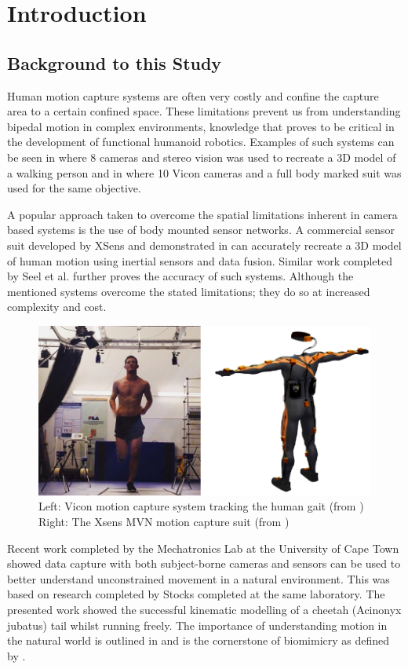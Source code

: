 \chapter{Introduction}

\section{Background to this Study}
Human motion capture systems are often very costly and confine the capture area to a certain confined space. These limitations prevent us from understanding bipedal motion in complex environments, knowledge that proves to be critical in the development of functional humanoid robotics. Examples of such systems can be seen in \cite{sandau2014markerless} where 8 cameras and stereo vision was used to recreate a 3D model of a walking person and in \cite{pfister2014comparative} where 10 Vicon cameras and a full body marked suit was used for the same objective.

A popular approach taken to overcome the spatial limitations inherent in camera based systems is the use of body mounted sensor networks. A commercial sensor suit developed by XSens and demonstrated in \cite{roetenberg2009xsens} can accurately recreate a 3D model of human motion using inertial sensors and data fusion. Similar work completed by Seel et al. \cite{seel2014imu} further proves the accuracy of such systems. Although the mentioned systems overcome the stated limitations; they do so at increased complexity and cost.

\begin{figure}[!ht] 
\captionsetup{width=0.8\linewidth, font=small}  
\includegraphics[width=0.8\linewidth]{figures/COMBO.png}
\caption{Left: Vicon motion capture system tracking the human gait (from 				\cite{roetenberg2009xsens}) Right: The Xsens MVN motion capture suit (from \cite{vicon})}
\label{fig:COMBO}
\end{figure}

Recent work \cite{patel2017trackingieee} completed by the Mechatronics Lab at the University of Cape Town showed data capture with both subject-borne cameras and sensors can be used to better understand unconstrained movement in a natural environment. This was based on research completed by Stocks \cite{bradstocks} completed at the same laboratory. The presented work showed the successful kinematic modelling of a cheetah (Acinonyx jubatus) tail whilst running freely. The importance of understanding motion in the natural world is outlined in \cite{patel2014rapid} and is the cornerstone of biomimicry as defined by \cite{benyus2002biomimicry}.
  
